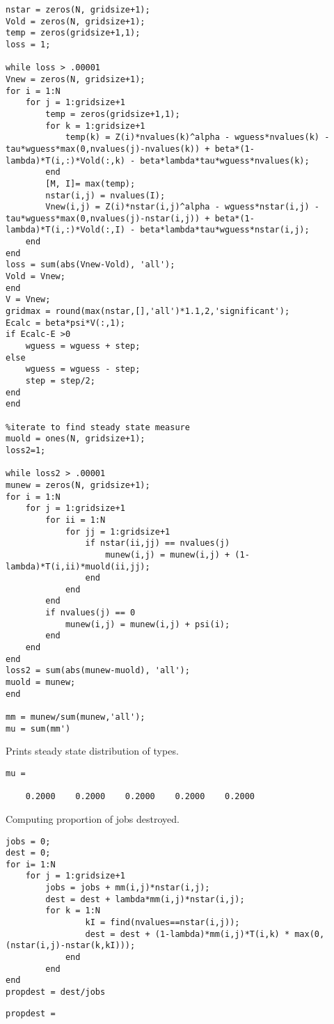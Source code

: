 \documentclass[12pt]{article}
\begin{document}
\begin{onehalfspace}
\begin{enumerate}[1.]
\begin{enumerate}
\begin{lstlisting}
nstar = zeros(N, gridsize+1);
Vold = zeros(N, gridsize+1);
temp = zeros(gridsize+1,1);
loss = 1;

while loss > .00001
Vnew = zeros(N, gridsize+1);
for i = 1:N
    for j = 1:gridsize+1
        temp = zeros(gridsize+1,1);
        for k = 1:gridsize+1
            temp(k) = Z(i)*nvalues(k)^alpha - wguess*nvalues(k) - tau*wguess*max(0,nvalues(j)-nvalues(k)) + beta*(1-lambda)*T(i,:)*Vold(:,k) - beta*lambda*tau*wguess*nvalues(k);
        end
        [M, I]= max(temp);
        nstar(i,j) = nvalues(I);
        Vnew(i,j) = Z(i)*nstar(i,j)^alpha - wguess*nstar(i,j) - tau*wguess*max(0,nvalues(j)-nstar(i,j)) + beta*(1-lambda)*T(i,:)*Vold(:,I) - beta*lambda*tau*wguess*nstar(i,j);
    end
end
loss = sum(abs(Vnew-Vold), 'all');
Vold = Vnew;
end
V = Vnew;
gridmax = round(max(nstar,[],'all')*1.1,2,'significant');
Ecalc = beta*psi*V(:,1);
if Ecalc-E >0
    wguess = wguess + step;
else
    wguess = wguess - step;
    step = step/2;
end
end

%iterate to find steady state measure
muold = ones(N, gridsize+1);
loss2=1;

while loss2 > .00001
munew = zeros(N, gridsize+1);
for i = 1:N
    for j = 1:gridsize+1
        for ii = 1:N
            for jj = 1:gridsize+1
                if nstar(ii,jj) == nvalues(j)
                    munew(i,j) = munew(i,j) + (1-lambda)*T(i,ii)*muold(ii,jj);
                end
            end
        end
        if nvalues(j) == 0
            munew(i,j) = munew(i,j) + psi(i);
        end
    end
end
loss2 = sum(abs(munew-muold), 'all');
muold = munew;
end

mm = munew/sum(munew,'all');
mu = sum(mm')
\end{lstlisting}
Prints steady state distribution of types.
\begin{lstlisting}
mu =

    0.2000    0.2000    0.2000    0.2000    0.2000
\end{lstlisting}
Computing proportion of jobs destroyed.
\begin{lstlisting}
jobs = 0;
dest = 0;
for i= 1:N
    for j = 1:gridsize+1
        jobs = jobs + mm(i,j)*nstar(i,j);
        dest = dest + lambda*mm(i,j)*nstar(i,j);
        for k = 1:N
                kI = find(nvalues==nstar(i,j));
                dest = dest + (1-lambda)*mm(i,j)*T(i,k) * max(0,(nstar(i,j)-nstar(k,kI)));
            end
        end
end
propdest = dest/jobs
\end{lstlisting}
\begin{lstlisting}
propdest =


\end{lstlisting}
\end{enumerate}
\end{enumerate}
\end{onehalfspace}
\end{document}
